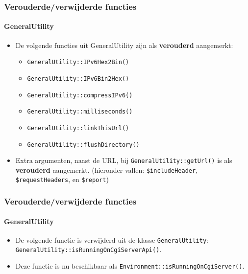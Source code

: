 \begin{frame}[fragile]
	\frametitle{Verouderde/verwijderde functies}
	\framesubtitle{GeneralUtility}

	\begin{itemize}
		\item De volgende functies uit GeneralUtility zijn als \textbf{verouderd} aangemerkt:
			\begin{itemize}\smaller
				\item \texttt{GeneralUtility::IPv6Hex2Bin()}
				\item \texttt{GeneralUtility::IPv6Bin2Hex()}
				\item \texttt{GeneralUtility::compressIPv6()}
				\item \texttt{GeneralUtility::milliseconds()}
				\item \texttt{GeneralUtility::linkThisUrl()}
				\item \texttt{GeneralUtility::flushDirectory()}
			\end{itemize}\normalsize
			\vspace{0.4cm}

		\item Extra argumenten, naast de URL, bij \texttt{GeneralUtility::getUrl()}
			is als \textbf{verouderd} aangemerkt.\newline
			\smaller
				(hieronder vallen: \texttt{\$includeHeader}, \texttt{\$requestHeaders}, en \texttt{\$report})
			\normalsize

	\end{itemize}

\end{frame}


\begin{frame}[fragile]
	\frametitle{Verouderde/verwijderde functies}
	\framesubtitle{GeneralUtility}

	\begin{itemize}
		\item De volgende functie is verwijderd uit de klasse \texttt{GeneralUtility}:
			\texttt{GeneralUtility::isRunningOnCgiServerApi()}.
		\item Deze functie is nu beschikbaar als\newline
			\texttt{Environment::isRunningOnCgiServer()}.

	\end{itemize}

\end{frame}


